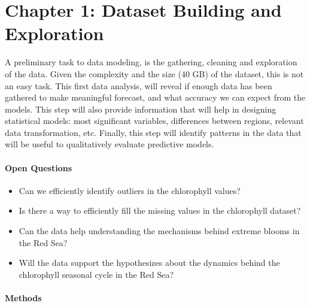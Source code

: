 \section{Chapter 1: Dataset Building and Exploration}

A preliminary task to data modeling, is the gathering, cleaning and exploration
of the data. Given the complexity and the size (40 GB) of the dataset, this is not
an easy task. This first data analysis, will reveal if enough data has been
gathered to make meaningful forecast, and what accuracy we can expect from the
models. This step will also provide information that will help in designing
statistical models: most significant variables, differences between regions,
relevant data transformation, etc. Finally, this step will identify patterns in
the data that will be useful to qualitatively evaluate predictive models.

\paragraph{Open Questions}

\begin{itemize} 

\item Can we efficiently identify outliers in the chlorophyll values?

\item Is there a way to efficiently fill the missing values in the chlorophyll
dataset?

\item Can the data help understanding the mechanisms behind extreme blooms in
the Red Sea?

\item Will the data support the hypothesizes about the dynamics behind the
chlorophyll seasonal cycle in the Red Sea?

\end{itemize}

\paragraph{Methods}

